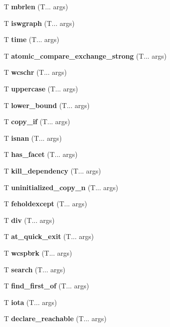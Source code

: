 \begin{DoxyCompactItemize}
T \textbf{ mbrlen} (T... args)
\item 
\mbox{\label{iswgraph}} 
T \textbf{ iswgraph} (T... args)
\item 
\mbox{\label{time}} 
T \textbf{ time} (T... args)
\item 
\mbox{\label{atomic_compare_exchange}} 
T \textbf{ atomic\+\_\+compare\+\_\+exchange\+\_\+strong} (T... args)
\item 
\mbox{\label{wcschr}} 
T \textbf{ wcschr} (T... args)
\item 
\mbox{\label{uppercase}} 
T \textbf{ uppercase} (T... args)
\item 
\mbox{\label{lower_bound}} 
T \textbf{ lower\+\_\+bound} (T... args)
\item 
\mbox{\label{copy}} 
T \textbf{ copy\+\_\+if} (T... args)
\item 
\mbox{\label{isnan}} 
T \textbf{ isnan} (T... args)
\item 
\mbox{\label{has_facet}} 
T \textbf{ has\+\_\+facet} (T... args)
\item 
\mbox{\label{kill_dependency}} 
T \textbf{ kill\+\_\+dependency} (T... args)
\item 
\mbox{\label{uninitialized_copy_n}} 
T \textbf{ uninitialized\+\_\+copy\+\_\+n} (T... args)
\item 
\mbox{\label{feholdexcept}} 
T \textbf{ feholdexcept} (T... args)
\item 
\mbox{\label{div}} 
T \textbf{ div} (T... args)
\item 
\mbox{\label{at_quick_exit}} 
T \textbf{ at\+\_\+quick\+\_\+exit} (T... args)
\item 
\mbox{\label{wcspbrk}} 
T \textbf{ wcspbrk} (T... args)
\item 
\mbox{\label{search}} 
T \textbf{ search} (T... args)
\item 
\mbox{\label{find_first_of}} 
T \textbf{ find\+\_\+first\+\_\+of} (T... args)
\item 
\mbox{\label{iota}} 
T \textbf{ iota} (T... args)
\item 
\mbox{\label{declare_reachable}} 
T \textbf{ declare\+\_\+reachable} (T... args)

\end{DoxyCompactItemize}
